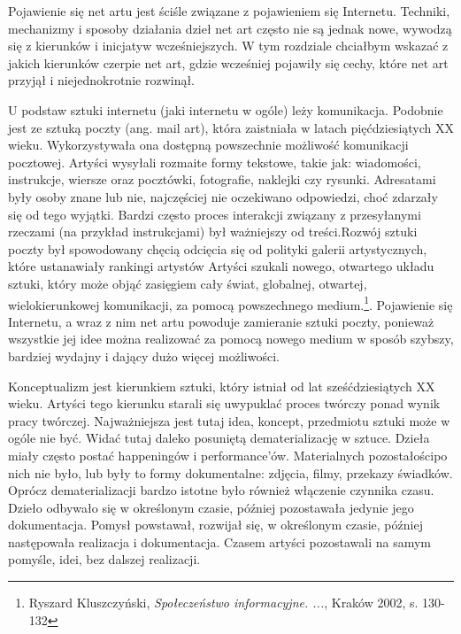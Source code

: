 \documentclass[a4paper,12pt,twoside]{article}
\begin{document}
Pojawienie się net artu jest ściśle związane z pojawieniem się Internetu.
Techniki, mechanizmy i sposoby działania dzieł net art często nie są
jednak nowe, wywodzą się z kierunków i inicjatyw wcześniejszych.
W tym rozdziale chciałbym wskazać z jakich kierunków czerpie net art,
gdzie wcześniej pojawiły się cechy, które net art przyjął i niejednokrotnie
rozwinął.

U podstaw sztuki internetu (jaki internetu w ogóle) leży komunikacja.
Podobnie jest ze sztuką poczty (ang. mail art), która zaistniała w latach
pięćdziesiątych XX wieku. Wykorzystywała ona dostępną powszechnie możliwość
komunikacji pocztowej. Artyści wysyłali rozmaite formy tekstowe, takie jak:
wiadomości, instrukcje, wiersze oraz pocztówki, fotografie, naklejki czy
rysunki. Adresatami były osoby znane lub nie, najczęściej nie oczekiwano
odpowiedzi, choć zdarzały się od tego wyjątki. Bardzi często proces
interakcji związany z przesyłanymi rzeczami (na przykład instrukcjami)
był ważniejszy od treści.Rozwój sztuki poczty był
spowodowany chęcią odcięcia się od polityki galerii artystycznych, które
ustanawiały rankingi artystów Artyści szukali nowego, otwartego układu
sztuki, który może objąć zasięgiem cały świat, globalnej, otwartej,
wielokierunkowej komunikacji, za pomocą powszechnego
medium.\footnote{Ryszard Kluszczyński,
\textit{Społeczeństwo informacyjne. ...}, Kraków 2002, s. 130-132}.
Pojawienie się Internetu, a wraz z nim net artu powoduje zamieranie sztuki
poczty, ponieważ wszystkie jej idee można realizować za pomocą nowego medium
w sposób szybszy, bardziej wydajny i dający dużo więcej możliwości.

Konceptualizm jest kierunkiem sztuki, który istniał od lat sześćdziesiątych
XX wieku. Artyści tego kierunku starali się uwypuklać proces twórczy
ponad wynik pracy twórczej. Najważniejsza jest tutaj idea, koncept,
przedmiotu sztuki może w ogóle nie być. Widać tutaj daleko posuniętą
dematerializację w sztuce. Dzieła miały często postać happeningów
i performance'ów. Materialnych pozostałościpo nich nie było, lub były
to formy dokumentalne: zdjęcia, filmy, przekazy świadków. Oprócz
dematerializacji bardzo istotne było również włączenie
czynnika czasu. Dzieło odbywało się w określonym czasie, później pozostawała
jedynie jego dokumentacja. Pomysł powstawał, rozwijał się, w określonym czasie,
później następowała realizacja i dokumentacja. Czasem artyści pozostawali
na samym pomyśle, idei, bez dalszej realizacji.
\end{document}
